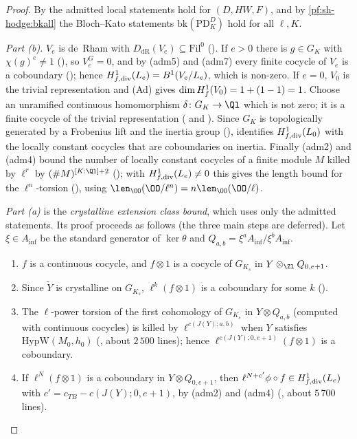 \begin{proof}
By  the admitted local statements hold for $(D,HW,F)$, and by
\cref{pf:sh-hodge:bkall} the Bloch--Kato statements $\mathrm{bk}(\mathrm{PD}^D_K)$ hold for all $\ell,K$.

\emph{Part (b).} $V_e$ is de~Rham with $D_{\mathrm{dR}}(V_e)\subseteq\mathrm{Fil}^0$
(). If $e>0$ there is $g\in G_K$ with $\chi(g)^e\ne1$
(), so $V_e^{G}=0$, and by (adm5) and (adm7) every finite cocycle of $V_e$ is a coboundary
(); hence $H^1_{f,\mathrm{div}}(L_e)=B^1(V_e/L_e)$, which is non-zero. If $e=0$, $V_0$ is the trivial representation and (Ad)
gives $\dim H^1_{f}(V_0)=1+(1-1)=1$. Choose an unramified continuous homomorphism $\delta\colon G_K\to\Ql$ which is not zero; it is a finite cocycle of the
trivial representation ( and ). Since $G_K$ is
topologically generated by a Frobenius lift and the inertia group (),
 identifies $H^1_{f,\mathrm{div}}(L_0)$ with the locally constant cocycles that are coboundaries on
inertia. Finally (adm2) and (adm4) bound the number of locally constant cocycles of a finite module $M$ killed by $\ell^r$ by $(\#M)^{[K:\Ql]+2}$
(); with $H^1_{f,\mathrm{div}}(L_e)\ne0$ this gives the length bound for the $\ell^n$-torsion
(), using $\len_\OO(\OO/\ell^n)=n\len_\OO(\OO/\ell)$.

\emph{Part (a)} is the \emph{crystalline extension class bound}, which uses only the admitted statements. Its proof proceeds as follows (the three main
steps are deferred). Let $\xi\in A_{\inf}$ be the standard generator of $\ker\theta$ and $Q_{a,b}=\xi^aA_{\inf}/\xi^bA_{\inf}$.
\begin{enumerate}[label=(\arabic*)]
\item $f$ is a continuous cocycle, and $f\otimes1$ is a cocycle of $G_{K_s}$ in $Y\otimes_{\Zl}Q_{0,e+1}$.
\item Since $\tilde Y$ is crystalline on $G_{K_s}$, $\ell^k(f\otimes1)$ is a coboundary for some $k$
  ().
\item The $\ell$-power torsion of the first cohomology of $G_{K_s}$ in $Y\otimes Q_{a,b}$ (computed with continuous cocycles) is killed by
  $\ell^{c(J(Y);a,b)}$ when $Y$ satisfies $\mathrm{HypW}(M_0,h_0)$ (, about $2\,500$ lines);
  hence $\ell^{c(J(Y);0,e+1)}(f\otimes1)$ is a coboundary.
\item If $\ell^N(f\otimes1)$ is a coboundary in $Y\otimes Q_{0,e+1}$, then $\ell^{N+c'}\phi\circ f\in H^1_{f,\mathrm{div}}(L_e)$ with $c'=c_{TB}-c(J(Y);0,e+1)$, by
  (adm2) and (adm4) (, about $5\,700$ lines).
\end{enumerate}
\end{proof}

